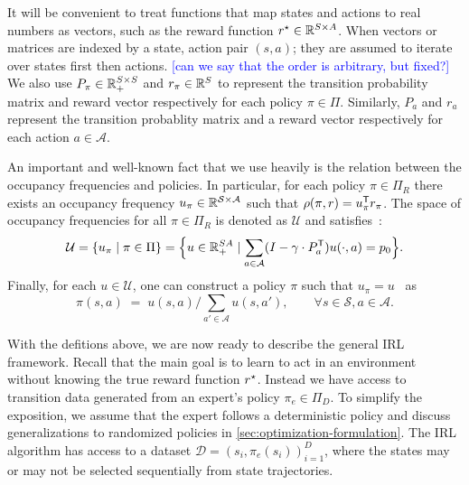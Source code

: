 \documentclass[10pt]{article}
\renewcommand{\cite}{\citep}
\newcommand{\mm}[1]{\textcolor{blue}{[#1]}}
\begin{document}
It will be convenient to treat functions that map states and actions to real numbers as vectors, such as the reward function $r^{\mathnormal{\star}} \in \mathbb{R}^{S \times  A}$. When vectors or matrices are indexed by a state, action pair $(s,a)$; they are assumed to iterate over states first then actions. \mm{can we say that the order is arbitrary, but fixed?} We also use $P_{\pi} \in \mathbb{R}_+^{S \times S}$ and $r_{\pi}\in \mathbb{R}^S$  to represent the transition probability matrix and reward vector respectively for each policy $\pi\in \Pi$. Similarly, $P_a$ and $r_a$ represent the transition probablity matrix and a reward vector respectively for each action $a\in \mathcal{A}$.

An important and well-known fact that we use heavily is the relation between the occupancy frequencies and policies. In particular, for each policy $\pi\in\Pi_R$ there exists an occupancy frequency $u_{\pi}\in \mathbb{R}^{\mathcal{S}\times \mathcal{A}}$ such that $\rho(\pi, r) = u_{\pi}^{\mathsf{T}} r_{\pi}$. The space of occupancy frequencies for all $\pi\in \Pi_R$
is denoted as $\mathcal{U}$ and satisfies~\cite[Section~6.9]{Puterman1994}:
\[
  \mathcal{U}
  =
\left\{ u_{\pi} \mid  \pi \in \Pi \right\}
  = \Bigl\{ u\in \mathbb{R}^{SA}_{+} \mid \sum_{a\in \mathcal{A}} (I - \gamma\cdot P^{\mathsf{T}}_a) u(\cdot, a) = p_0 \Bigr\}.
\]
Finally, for each $u\in \mathcal{U}$, one can construct a policy $\pi$ such that $u_{\pi} = u$~\cite[Theorem~6.9.1]{Puterman1994} as
\begin{equation}\label{eq:policy-construction}
	\pi(s, a) \; =\;  u(s,a) / \sum_{a' \in \mathcal{A}} u(s,a'), \qquad \forall s\in \mathcal{S}, a\in \mathcal{A}.
\end{equation}



With the defitions above, we are now ready to describe the general IRL framework. Recall that the main goal is to learn to act in an environment without knowing the true reward function $r^{\mathnormal{\star}}$. Instead we have access to transition data generated from an expert's policy $\pi_e \in \Pi_D$. To simplify the exposition, we assume that the expert follows a deterministic policy and discuss generalizations to randomized policies in \cref{sec:optimization-formulation}. The IRL algorithm has access to a dataset  \( \mathcal{D} = {(s_i, \pi_e(s_i))}_{i=1}^D \), where the states may or may not be selected sequentially from state trajectories.
\end{document}
